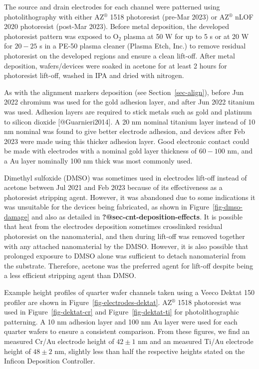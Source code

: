 \documentclass[
  letterpaper,
  DIV=11,
  numbers=noendperiod]{scrartcl}
\begin{document}
The source and drain electrodes for each channel were patterned using
photolithography with either AZ\(^\circledR\) 1518 photoresist (pre-Mar
2023) or AZ\(^\circledR\) nLOF 2020 photoresist (post-Mar 2023). Before
metal deposition, the developed photoresist pattern was exposed to
O\(_2\) plasma at 50 W for up to 5 s or at 20 W for \(20-25\) s in a
PE-50 plasma cleaner (Plasma Etch, Inc.) to remove residual photoresist
on the developed regions and ensure a clean lift-off. After metal
deposition, wafers/devices were soaked in acetone for at least 2 hours
for photoresist lift-off, washed in IPA and dried with nitrogen.

As with the alignment markers deposition (see Section~\ref{sec-align}),
before Jun 2022 chromium was used for the gold adhesion layer, and after
Jun 2022 titanium was used. Adhesion layers are required to stick metals
such as gold and platinum to silicon dioxide {[}@Guarnieri2014{]}. A 20
nm nominal titanium layer instead of 10 nm nominal was found to give
better electrode adhesion, and devices after Feb 2023 were made using
this thicker adhesion layer. Good electronic contact could be made with
electrodes with a nominal gold layer thickness of \(60-100\) nm, and a
Au layer nominally 100 nm thick was most commonly used.

Dimethyl sulfoxide (DMSO) was sometimes used in electrodes lift-off
instead of acetone between Jul 2021 and Feb 2023 because of its
effectiveness as a photoresist stripping agent. However, it was
abandoned due to some indications it was unsuitable for the devices
being fabricated, as shown in Figure~\ref{fig-dmso-damage} and also as
detailed in \textbf{?@sec-cnt-deposition-effects}. It is possible that
heat from the electrodes deposition sometimes crosslinked residual
photoresist on the nanomaterial, and then during lift-off was removed
together with any attached nanomaterial by the DMSO. However, it is also
possible that prolonged exposure to DMSO alone was sufficient to detach
nanomaterial from the substrate. Therefore, acetone was the preferred
agent for lift-off despite being a less efficient stripping agent than
DMSO.

Example height profiles of quarter wafer channels taken using a Veeco
Dektat 150 profiler are shown in Figure~\ref{fig-electrodes-dektat}.
AZ\(^\circledR\) 1518 photoresist was used in Figure~\ref{fig-dektat-cr}
and Figure~\ref{fig-dektat-ti} for photolithographic patterning. A 10 nm
adhesion layer and 100 nm Au layer were used for each quarter wafers to
ensure a consistent comparison. From these figures, we find an measured
Cr/Au electrode height of \(42\pm1\) nm and an measured Ti/Au electrode
height of \(48\pm2\) nm, slightly less than half the respective heights
stated on the Inficon Deposition Controller.
\end{document}
